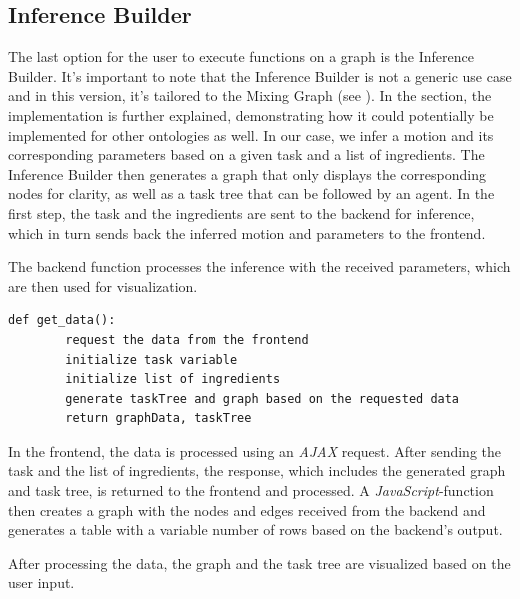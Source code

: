 \subsection{Inference Builder}
The last option for the user to execute functions on a graph is the Inference Builder. 
It's important to note that the Inference Builder is not a generic use case and in this version, it's tailored to the Mixing Graph (see ). 
In the  section, the implementation is further explained, demonstrating how it could potentially be implemented for other ontologies as well. 
In our case, we infer a motion and its corresponding parameters based on a given task and a list of ingredients. 
The Inference Builder then generates a graph that only displays the corresponding nodes for clarity, as well as a task tree that can be followed by an agent.
In the first step, the task and the ingredients are sent to the backend for inference, which in turn sends back the inferred motion and parameters to the frontend.


The backend function processes the inference with the received parameters, which are then used for visualization.


\begin{lstlisting}[caption={Inference Builder pipeline},captionpos=b]
    def get_data():
        request the data from the frontend
        initialize task variable
        initialize list of ingredients
        generate taskTree and graph based on the requested data
        return graphData, taskTree
\end{lstlisting}
In the frontend, the data is processed using an \textit{AJAX} request. After sending the task and the list of ingredients, the response, which includes the generated graph and task tree, is returned to the frontend and processed. A \textit{JavaScript}-function then creates a graph with the nodes and edges received from the backend and generates a table with a variable number of rows based on the backend's output.

After processing the data, the graph and the task tree are visualized based on the user input.

